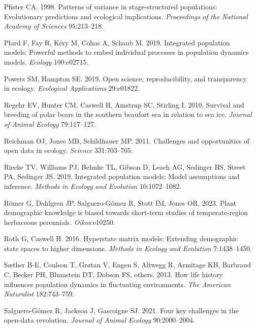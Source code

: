 \documentclass[
  12pt,
  letterpaper,
]{book}
\newlength{\cslhangindent}
\newenvironment{CSLReferences}[2] %
 {\begin{list}{}{%
  \setlength{\itemindent}{0pt}
  \setlength{\leftmargin}{0pt}
  \setlength{\parsep}{0pt}
  \ifodd #1
   \setlength{\leftmargin}{\cslhangindent}
   \setlength{\itemindent}{-1\cslhangindent}
  \fi
  \setlength{\itemsep}{#2\baselineskip}}}
 {\end{list}}
\begin{document}
\begin{CSLReferences}{1}{0}
Pfister CA. 1998. Patterns of variance in stage-structured populations:
Evolutionary predictions and ecological implications. \emph{Proceedings
of the National Academy of Sciences} 95:213--218.

Plard F, Fay R, Kéry M, Cohas A, Schaub M. 2019. Integrated population
models: Powerful methods to embed individual processes in population
dynamics models. \emph{Ecology} 100:e02715.

Powers SM, Hampton SE. 2019. Open science, reproducibility, and
transparency in ecology. \emph{Ecological Applications} 29:e01822.

Regehr EV, Hunter CM, Caswell H, Amstrup SC, Stirling I. 2010. Survival
and breeding of polar bears in the southern beaufort sea in relation to
sea ice. \emph{Journal of Animal Ecology} 79:117--127.

Reichman OJ, Jones MB, Schildhauer MP. 2011. Challenges and
opportunities of open data in ecology. \emph{Science} 331:703--705.

Riecke TV, Williams PJ, Behnke TL, Gibson D, Leach AG, Sedinger BS,
Street PA, Sedinger JS. 2019. Integrated population models: Model
assumptions and inference. \emph{Methods in Ecology and Evolution}
10:1072--1082.

Römer G, Dahlgren JP, Salguero-Gómez R, Stott IM, Jones OR. 2023. Plant
demographic knowledge is biased towards short-term studies of
temperate-region herbaceous perennials. \emph{Oikos}:e10250.

Roth G, Caswell H. 2016. Hyperstate matrix models: Extending demographic
state spaces to higher dimensions. \emph{Methods in Ecology and
Evolution} 7:1438--1450.

Sæther B-E, Coulson T, Grøtan V, Engen S, Altwegg R, Armitage KB,
Barbraud C, Becker PH, Blumstein DT, Dobson FS, others. 2013. How life
history influences population dynamics in fluctuating environments.
\emph{The American Naturalist} 182:743--759.

Salguero-Gómez R, Jackson J, Gascoigne SJ. 2021. Four key challenges in
the open-data revolution. \emph{Journal of Animal Ecology}
90:2000--2004.


\end{CSLReferences}
\end{document}
